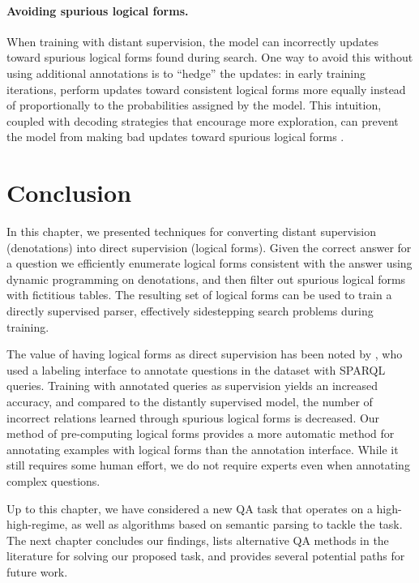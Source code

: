 \paragraph{Avoiding spurious logical forms.}
When training with distant supervision,
the model can incorrectly updates toward spurious logical forms
found during search.
One way to avoid this without using additional annotations
is to ``hedge'' the updates:
in early training iterations,
perform updates toward consistent logical forms more equally
instead of proportionally to the probabilities assigned by the model.
This intuition, coupled with decoding strategies
that encourage more exploration,
can prevent the model from making bad updates toward spurious logical forms
\cite{guu2017bridging,misra2018policy}.

\section{Conclusion}
In this chapter,
we presented techniques for converting
distant supervision (denotations) into direct supervision
(logical forms).
Given the correct answer for a question
we efficiently enumerate logical forms consistent with the answer
using dynamic programming on denotations,
and then filter out spurious logical forms
with fictitious tables.
The resulting set of logical forms
can be used to train a directly supervised parser,
effectively sidestepping search problems during training.

The value of having logical forms as direct supervision
has been noted by \citet{yih2016value},
who used a labeling interface to annotate
questions in the  dataset \cite{berant2013freebase}
with SPARQL queries.
Training with annotated queries as supervision
yields an increased accuracy,
and compared to the distantly supervised model,
the number of incorrect relations
learned through spurious logical forms
is decreased.
Our method of pre-computing logical forms
provides a more automatic method for annotating
examples with logical forms than the annotation interface.
While it still requires some human effort,
we do not require experts even when annotating complex questions.

Up to this chapter,
we have considered a new QA task that operates
on a high-\Breadth high-\Depth regime,
as well as algorithms based on semantic parsing 
to tackle the task.
The next chapter concludes our findings,
lists alternative QA methods in the literature
for solving our proposed task,
and provides several potential paths for future work.
